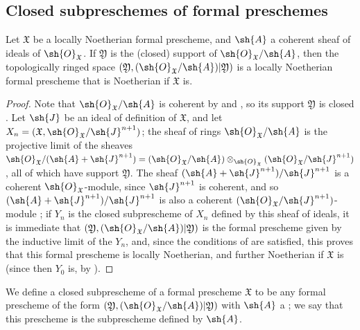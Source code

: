 \subsection{Closed subpreschemes of formal preschemes}
\label{subsection:I.10.14}

\begin{proposition}[10.14.1]
\label{I.10.14.1}
Let $\mathfrak{X}$ be a locally Noetherian formal prescheme, and $\sh{A}$ a coherent sheaf of ideals of $\sh{O}_\mathfrak{X}$.
If $\mathfrak{Y}$ is the (closed) support of $\sh{O}_\mathfrak{X}/\sh{A}$, then the topologically ringed space $(\mathfrak{Y},(\sh{O}_\mathfrak{X}/\sh{A})|\mathfrak{Y})$ is a locally Noetherian formal prescheme that is Noetherian if $\mathfrak{X}$ is.
\end{proposition}

\begin{proof}
Note that $\sh{O}_\mathfrak{X}/\sh{A}$ is coherent by  and , so its support $\mathfrak{Y}$ is closed .
Let $\sh{J}$ be an ideal of definition of $\mathfrak{X}$, and let $X_n=(\mathfrak{X},\sh{O}_\mathfrak{X}/\sh{J}^{n+1})$;
the sheaf of rings $\sh{O}_\mathfrak{X}/\sh{A}$ is the projective limit of the sheaves $\sh{O}_\mathfrak{X}/(\sh{A}+\sh{J}^{n+1})=(\sh{O}_\mathfrak{X}/\sh{A})\otimes_{\sh{O}_\mathfrak{X}}(\sh{O}_\mathfrak{X}/\sh{J}^{n+1})$ , all of which have support $\mathfrak{Y}$.
The sheaf $(\sh{A}+\sh{J}^{n+1})/\sh{J}^{n+1}$ is a coherent $\sh{O}_\mathfrak{X}$-module, since $\sh{J}^{n+1}$ is coherent, and so $(\sh{A}+\sh{J}^{n+1})/\sh{J}^{n+1}$ is also a coherent $(\sh{O}_\mathfrak{X}/\sh{J}^{n+1})$-module ;
if $Y_n$ is the closed subprescheme of $X_n$ defined by this sheaf of ideals, it is immediate that $(\mathfrak{Y},(\sh{O}_\mathfrak{X}/\sh{A})|\mathfrak{Y})$
is the formal prescheme given by the inductive limit of the $Y_n$, and, since the conditions of  are satisfied, this proves that this formal prescheme is locally Noetherian, and further Noetherian if $\mathfrak{X}$ is (since then $Y_0$ is, by ).
\end{proof}

\begin{definition}[10.14.2]
\label{I.10.14.2}
We define a closed subprescheme of a formal prescheme $\mathfrak{X}$ to be any formal prescheme of the form $(\mathfrak{Y},(\sh{O}_\mathfrak{X}/\sh{A})|\mathfrak{Y})$ with $\sh{A}$ a ;
we say that this prescheme is the subprescheme defined by $\sh{A}$.
\end{definition}

